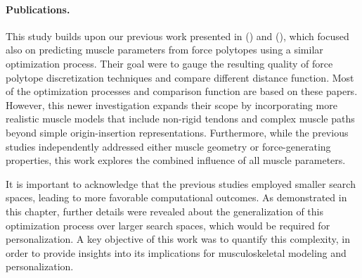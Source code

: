 \paragraph*{Publications.}
This study builds upon our previous work presented in (\cite{laisneGeneticAlgorithmsForce2023}) and (\cite{laisneDerivativeFreeOptimizationApproaches2023}), which focused also on predicting muscle parameters from force polytopes using a similar optimization process. Their goal were to gauge the resulting quality of force polytope discretization techniques and compare different distance function. Most of the optimization processes and comparison function are based on these papers. However, this newer investigation expands their scope by incorporating more realistic muscle models that include non-rigid tendons and complex muscle paths beyond simple origin-insertion representations.  Furthermore, while the previous studies independently addressed either muscle geometry or force-generating properties, this work explores the combined influence of all muscle parameters.

It is important to acknowledge that the previous studies employed smaller search spaces, leading to more favorable computational outcomes. As demonstrated in this chapter, further details were revealed about the generalization of this optimization process over larger search spaces, which would be required for personalization. A key objective of this work was to quantify this complexity, in order to provide insights into its implications for musculoskeletal modeling and personalization.






